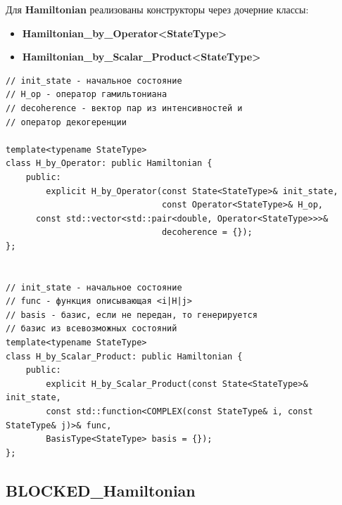 \documentclass[12pt,fleqn]{article}
\begin{document}
Для \textbf{Hamiltonian} реализованы конструкторы через дочерние классы:
\begin{itemize}
    \item{\textbf{Hamiltonian\_by\_Operator<StateType>}}
    \item{\textbf{Hamiltonian\_by\_Scalar\_Product<StateType>}}
\end{itemize}

\begin{mdframed}[linecolor=black, topline=true, bottomline=true,
    leftline=false, rightline=false]
\begin{verbatim}
// init_state - начальное состояние
// H_op - оператор гамильтониана
// decoherence - вектор пар из интенсивностей и
// оператор декогеренции

template<typename StateType>
class H_by_Operator: public Hamiltonian {
    public:
        explicit H_by_Operator(const State<StateType>& init_state, 
                               const Operator<StateType>& H_op,
      const std::vector<std::pair<double, Operator<StateType>>>&
                               decoherence = {});
};


// init_state - начальное состояние
// func - функция описывающая <i|H|j> 
// basis - базис, если не передан, то генерируется 
// базис из всевозможных состояний
template<typename StateType>
class H_by_Scalar_Product: public Hamiltonian {
    public:
        explicit H_by_Scalar_Product(const State<StateType>& init_state, 
        const std::function<COMPLEX(const StateType& i, const StateType& j)>& func,
        BasisType<StateType> basis = {});
};

\end{verbatim}
\end{mdframed}



        \subsection{\textbf{BLOCKED\_Hamiltonian}}
\end{document}
